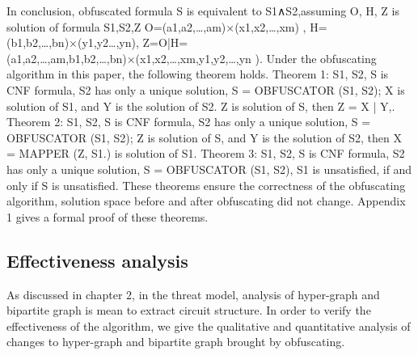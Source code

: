 \documentclass[runningheads,a4paper]{llncs}
\begin{document}
In conclusion, obfuscated formula S is equivalent to S1∧S2,assuming O, H, Z is solution of formula S1,S2,Z 
O={(a1,a2,…,am)×(x1,x2,…,xm) }, H={(b1,b2,…,bn)×(y1,y2…,yn)}, Z=O|H={(a1,a2,…,am,b1,b2,…,bn)×(x1,x2,…,xm,y1,y2,…,yn )}.
Under the obfuscating algorithm in this paper, the following theorem holds.
Theorem 1: S1, S2, S is CNF formula, S2 has only a unique solution, S = OBFUSCATOR (S1, S2); X is solution of S1, and Y is the solution of S2. Z is solution of S, then Z = X | Y,.
Theorem 2: S1, S2, S is CNF formula, S2 has only a unique solution, S = OBFUSCATOR (S1, S2); Z is solution of S, and Y is the solution of S2, then X = MAPPER (Z, S1.) is solution of S1.
Theorem 3: S1, S2, S is CNF formula, S2 has only a unique solution, S = OBFUSCATOR (S1, S2), S1 is unsatisfied, if and only if S is unsatisfied.
These theorems ensure the correctness of the obfuscating algorithm, solution space before and after obfuscating did not change. Appendix 1 gives a formal proof of these theorems.
\subsection{Effectiveness analysis}
As discussed in chapter 2, in the threat model, analysis of hyper-graph and bipartite graph is mean to extract circuit structure. In order to verify the effectiveness of the algorithm, we give the qualitative and quantitative analysis of changes to hyper-graph and bipartite graph brought by obfuscating.
\end{document}
